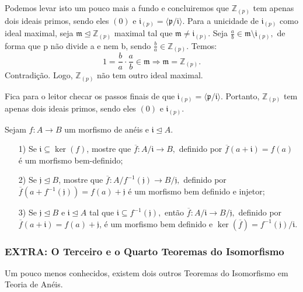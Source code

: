 \documentclass[AlgebraII/algebraII_notes.tex]{subfiles}
\begin{document}
\begin{example}
	Podemos levar isto um pouco mais a fundo e concluiremos que \(\mathbb{Z}_{(p)}\) tem apenas dois ideais primos, sendo eles \((0)\) e \(\mathfrak{i}_{(p)}=\langle \mathfrak{p}/\mathfrak{i} \rangle.\)
	Para a unicidade de \(\mathfrak{i}_{(p)}\) como ideal maximal, seja \(\mathfrak{m}\trianglelefteq \mathbb{Z}_{(p)}\) maximal tal que \(\mathfrak{m}\neq \mathfrak{i}_{(p)}\). Seja
	\(\frac{a}{b}\in \mathfrak{m}\setminus{\mathfrak{i}_{(p)}},\) de forma que p não divide a e nem b, sendo \(\frac{b}{a}\in \mathbb{Z}_{(p)}\). Temos:
	\[
		1 = \frac{b}{a}\cdot \frac{a}{b}\in \mathfrak{m}\Rightarrow \mathfrak{m}=\mathbb{Z}_{(p)}.
	\]
	Contradição. Logo, \(\mathbb{Z}_{(p)}\) não tem outro ideal maximal.

	Fica para o leitor checar os passos finais de que \(\mathfrak{i}_{(p)} = \langle \mathfrak{p}/\mathfrak{i} \rangle.\) Portanto, \(\mathbb{Z}_{(p)}\) tem apenas
	dois ideais primos, sendo eles \((0)\) e \(\mathfrak{i}_{(p)}.\)
\end{example}
\begin{prop*}[Exercício]
	Sejam \(f:A\rightarrow B\) um morfismo de anéis e \(\mathfrak{i}\trianglelefteq{A}.\)
	\begin{itemize}
		\item[1)] Se \(\mathfrak{i}\subseteq \ker{(f)}\), mostre que \(\overline{f}:A/\mathfrak{i}\rightarrow B,\) definido por \(\overline{f}(a+\mathfrak{i}) = f(a)\) é
		      um morfismo bem-definido;
		\item[2)] Se \(\mathfrak{j}\trianglelefteq{B}\), mostre que \(\overline{f}:A/f^{-1}(\mathfrak{j})\rightarrow B/\mathfrak{j},\) definido por
		      \(\overline{f}(a+f^{-1}(\mathfrak{j})) = f(a) + \mathfrak{j}\) é um morfismo bem definido e injetor;
		\item[3)] Se \(\mathfrak{j}\trianglelefteq{B}\) e \(\mathfrak{i}\trianglelefteq{A}\) tal que \(\mathfrak{i}\subseteq f^{-1}(\mathfrak{j}),\) então
		      \(\overline{f}:A/\mathfrak{i}\rightarrow B/\mathfrak{j}, \) definido por \(\overline{f}(a+\mathfrak{i})=f(a)+\mathfrak{j}\),
		      é um morfismo bem definido e \(\ker{(\overline{f})} = f^{-1}(\mathfrak{j})/\mathfrak{i}.\)
	\end{itemize}
\end{prop*}
\subsubsection{EXTRA: O Terceiro e o Quarto Teoremas do Isomorfismo}
Um pouco menos conhecidos, existem dois outros Teoremas do Isomorfismo em Teoria de Anéis.
\end{document}
